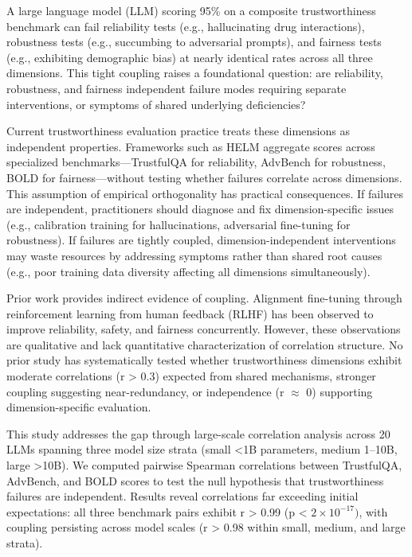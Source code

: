 
A large language model (LLM) scoring 95\% on a composite trustworthiness benchmark can fail reliability tests (e.g., hallucinating drug interactions), robustness tests (e.g., succumbing to adversarial prompts), and fairness tests (e.g., exhibiting demographic bias) at nearly identical rates across all three dimensions. This tight coupling raises a foundational question: are reliability, robustness, and fairness independent failure modes requiring separate interventions, or symptoms of shared underlying deficiencies?

Current trustworthiness evaluation practice treats these dimensions as independent properties. Frameworks such as HELM aggregate scores across specialized benchmarks---TrustfulQA for reliability, AdvBench for robustness, BOLD for fairness---without testing whether failures correlate across dimensions. This assumption of empirical orthogonality has practical consequences. If failures are independent, practitioners should diagnose and fix dimension-specific issues (e.g., calibration training for hallucinations, adversarial fine-tuning for robustness). If failures are tightly coupled, dimension-independent interventions may waste resources by addressing symptoms rather than shared root causes (e.g., poor training data diversity affecting all dimensions simultaneously).

Prior work provides indirect evidence of coupling. Alignment fine-tuning through reinforcement learning from human feedback (RLHF) has been observed to improve reliability, safety, and fairness concurrently. However, these observations are qualitative and lack quantitative characterization of correlation structure. No prior study has systematically tested whether trustworthiness dimensions exhibit moderate correlations (r > 0.3) expected from shared mechanisms, stronger coupling suggesting near-redundancy, or independence (r $\approx$ 0) supporting dimension-specific evaluation.

This study addresses the gap through large-scale correlation analysis across 20 LLMs spanning three model size strata (small <1B parameters, medium 1--10B, large >10B). We computed pairwise Spearman correlations between TrustfulQA, AdvBench, and BOLD scores to test the null hypothesis that trustworthiness failures are independent. Results reveal correlations far exceeding initial expectations: all three benchmark pairs exhibit r > 0.99 (p < $2\times 10^{-17})$, with coupling persisting across model scales (r > 0.98 within small, medium, and large strata).

